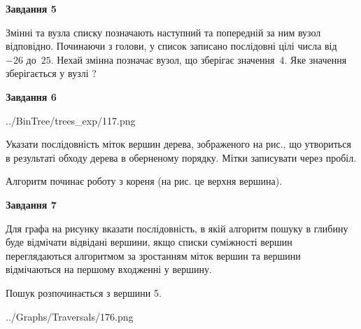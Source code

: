 \documentclass[12pt, ukrainian]{article}
\begin{document}
{\begin {large}
{\begin {center}\textbf{Завдання 5}\end {center}}\par
Змінні  та  вузла списку позначають наступний та попередній за ним вузол відповідно. Починаючи з голови, у список записано послідовні цілі числа від~$-26$ до~$25$. Нехай змінна  позначає вузол, що зберігає значення~$4$.
Яке значення зберігається у вузлі  ?\par
\newpage

{\begin {center}\textbf{Завдання 6}\end {center}}\par

\begin{center}
	{../BinTree/trees_exp/117.png}
\end{center}
Указати послідовність міток вершин дерева, зображеного на рис., що утвориться в результаті обходу дерева в оберненому порядку. Мітки записувати через пробіл.\par Алгоритм починає роботу з кореня (на рис. це верхня вершина).\par
\newpage

{\begin {center}\textbf{Завдання 7}\end {center}}\par
Для графа на рисунку вказати послідовність, в якій алгоритм пошуку в глибину буде відмічати відвідані вершини, якщо списки суміжності вершин переглядаються алгоритмом за зростанням міток вершин та вершини відмічаються на першому вход\-женні у вершину.\par
Пошук розпочинається з вершини 5.\par

\begin{center}
	{../Graphs/Traversals/176.png}
\end{center}\par
\newpage


\end{large}}
\end{document}
